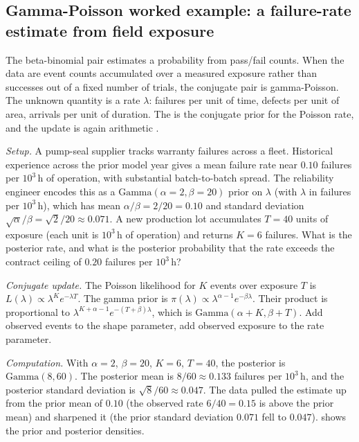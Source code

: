 \subsection{Gamma-Poisson worked example: a failure-rate estimate
from field exposure}

The beta-binomial pair estimates a probability from pass/fail
counts. When the data are event counts accumulated over a measured
exposure rather than successes out of a fixed number of trials, the
conjugate pair is gamma-Poisson. The unknown quantity is a rate
$\lambda$: failures per unit of time, defects per unit of area,
arrivals per unit of duration. The  is
the conjugate prior for the Poisson rate, and the update is again
arithmetic \cite[ch.~2]{text:ch08-gelman-bda3-2013}.

\textit{Setup.} A pump-seal supplier tracks warranty failures
across a fleet. Historical experience across the prior model year
gives a mean failure rate near $0.10$ failures per
$10^{3}\,\si{\hour}$ of operation, with substantial batch-to-batch
spread. The reliability engineer encodes this as a
$\text{Gamma}(\alpha = 2, \beta = 20)$ prior on $\lambda$ (with
$\lambda$ in failures per $10^{3}\,\si{\hour}$), which has mean
$\alpha/\beta = 2/20 = 0.10$ and standard deviation
$\sqrt{\alpha}/\beta = \sqrt{2}/20 \approx 0.071$. A new production
lot accumulates $T = 40$ units of exposure (each unit is
$10^{3}\,\si{\hour}$ of operation) and returns $K = 6$ failures.
What is the posterior rate, and what is the posterior probability
that the rate exceeds the contract ceiling of $0.20$ failures per
$10^{3}\,\si{\hour}$?

\textit{Conjugate update.} The Poisson likelihood for $K$ events
over exposure $T$ is $L(\lambda) \propto \lambda^{K}
e^{-\lambda T}$. The gamma prior is $\pi(\lambda) \propto
\lambda^{\alpha - 1} e^{-\beta \lambda}$. Their product is
proportional to $\lambda^{K + \alpha - 1} e^{-(T + \beta)\lambda}$,
which is $\text{Gamma}(\alpha + K, \beta + T)$. Add observed
events to the shape parameter, add observed exposure to the rate
parameter.

\textit{Computation.} With $\alpha = 2$, $\beta = 20$, $K = 6$,
$T = 40$, the posterior is $\text{Gamma}(8, 60)$. The posterior
mean is $8/60 \approx 0.133$ failures per $10^{3}\,\si{\hour}$, and
the posterior standard deviation is $\sqrt{8}/60 \approx 0.047$.
The data pulled the estimate up from the prior mean of $0.10$ (the
observed rate $6/40 = 0.15$ is above the prior mean) and sharpened
it (the prior standard deviation $0.071$ fell to $0.047$).
 shows the prior and
posterior densities.

